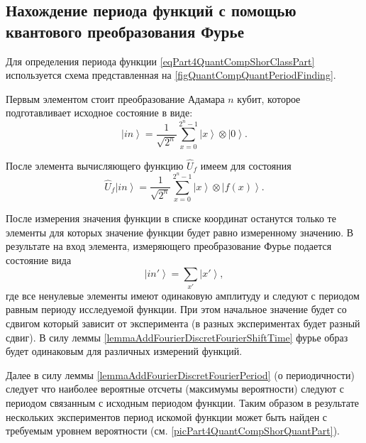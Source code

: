 \subsection{Нахождение периода функций с помощью квантового
  преобразования Фурье}

Для определения периода функции \eqref{eqPart4QuantCompShorClassPart}
используется схема представленная на
\autoref{figQuantCompQuantPeriodFinding}.



Первым элементом стоит преобразование Адамара $n$ кубит, которое
подготавливает исходное состояние в виде:
\begin{equation}
\left|in\right> = \frac{1}{\sqrt{2^n}}\sum_{x=0}^{2^n - 1} \left|x\right>
\otimes\left|0\right>.
\nonumber
\end{equation}

После элемента вычисляющего функцию $\hat{U}_f$ имеем для состояния
\begin{equation}
\hat{U}_f\left|in\right> = \frac{1}{\sqrt{2^n}}\sum_{x=0}^{2^n - 1} \left|x\right>
\otimes\left|f\left(x\right)\right>.
\nonumber
\end{equation} 



После измерения значения функции в списке координат останутся только
те элементы для которых значение функции будет равно измеренному
значению. В результате на вход элемента, измеряющего преобразование
Фурье подается состояние вида 
\begin{equation}
\left|in'\right> = \sum_{x'} \left|x'\right>,
\nonumber
\end{equation} 
где все ненулевые элементы имеют одинаковую амплитуду и следуют с
периодом равным периоду исследуемой функции. При этом начальное
значение будет со сдвигом который зависит от эксперимента (в разных
экспериментах будет разный сдвиг). В силу леммы
\ref{lemmaAddFourierDiscretFourierShiftTime} фурье образ будет
одинаковым для различных измерений функций.

Далее в силу леммы \ref{lemmaAddFourierDiscretFourierPeriod}
(о периодичности) следует что наиболее вероятные отсчеты (максимумы
вероятности) следуют с периодом связанным с исходным периодом
функции. Таким образом в результате нескольких экспериментов период
искомой функции может быть найден с требуемым уровнем вероятности
(см. \autoref{picPart4QuantCompShorQuantPart}).

